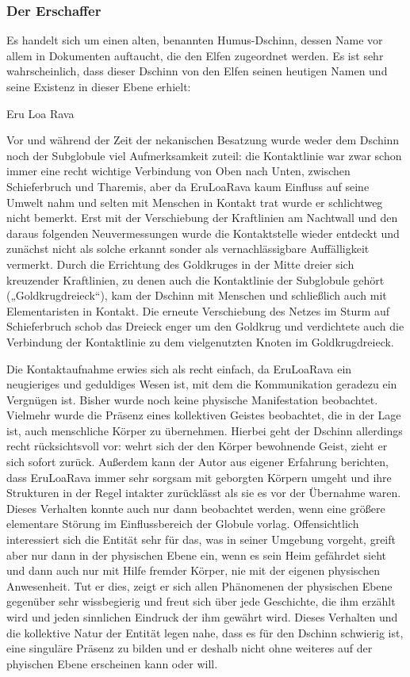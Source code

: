 \documentclass[a5paper,8pt]{book}
\begin{document}
\subsubsection{Der Erschaffer}
Es handelt sich um einen alten, benannten Humus-Dschinn, dessen Name vor allem in Dokumenten auftaucht, die den Elfen 
zugeordnet werden. Es ist sehr wahrscheinlich, dass dieser Dschinn von den Elfen seinen heutigen Namen und seine Existenz 
in dieser Ebene erhielt: 


Eru Loa Rava

Vor und während der Zeit der nekanischen Besatzung wurde weder dem Dschinn noch der Subglobule viel Aufmerksamkeit zuteil: 
die Kontaktlinie war zwar schon immer eine recht wichtige Verbindung von Oben nach Unten, zwischen Schieferbruch und 
Tharemis, aber da EruLoaRava kaum Einfluss auf seine Umwelt nahm und selten mit Menschen in Kontakt trat wurde er 
schlichtweg nicht bemerkt. Erst mit der Verschiebung der Kraftlinien am Nachtwall und den daraus folgenden Neuvermessungen 
wurde die Kontaktstelle wieder entdeckt und zunächst nicht als solche erkannt sonder als vernachlässigbare Auffälligkeit 
vermerkt. Durch die Errichtung des Goldkruges in der Mitte dreier sich kreuzender Kraftlinien, zu denen auch die 
Kontaktlinie der Subglobule gehört („Goldkrugdreieck“), kam der Dschinn mit Menschen und schließlich auch mit 
Elementaristen in Kontakt. Die erneute Verschiebung des Netzes im Sturm auf Schieferbruch schob das Dreieck enger um den 
Goldkrug und verdichtete auch die Verbindung der Kontaktlinie zu dem vielgenutzten Knoten im Goldkrugdreieck. 

Die Kontaktaufnahme erwies sich als recht einfach, da EruLoaRava ein neugieriges und geduldiges Wesen ist, mit dem die 
Kommunikation geradezu ein Vergnügen ist. Bisher wurde noch keine physische Manifestation beobachtet. Vielmehr wurde die 
Präsenz eines kollektiven Geistes beobachtet, die in der Lage ist, auch menschliche Körper zu übernehmen. Hierbei geht der 
Dschinn allerdings recht rücksichtsvoll vor: wehrt sich der den Körper bewohnende Geist, zieht er sich sofort zurück. 
Außerdem kann der Autor aus eigener Erfahrung berichten, dass EruLoaRava immer sehr sorgsam mit geborgten Körpern umgeht 
und ihre Strukturen in der Regel intakter zurücklässt als sie es vor der Übernahme waren. Dieses Verhalten konnte auch nur 
dann beobachtet werden, wenn eine größere elementare Störung im Einflussbereich der Globule vorlag. Offensichtlich 
interessiert sich die Entität sehr für das, was in seiner Umgebung vorgeht, greift aber nur dann in der physischen Ebene 
ein, wenn es sein Heim gefährdet sieht und dann auch nur mit Hilfe fremder Körper, nie mit der eigenen physischen 
Anwesenheit. Tut er dies, zeigt er sich allen Phänomenen der physischen Ebene gegenüber sehr wissbegierig und freut sich 
über jede Geschichte, die ihm erzählt wird und jeden sinnlichen Eindruck der ihm gewährt wird. Dieses Verhalten und die 
kollektive Natur der Entität legen nahe, dass es für den Dschinn schwierig ist, eine singuläre Präsenz zu bilden und er 
deshalb nicht ohne weiteres auf der phyischen Ebene erscheinen kann oder will. 
\end{document}
